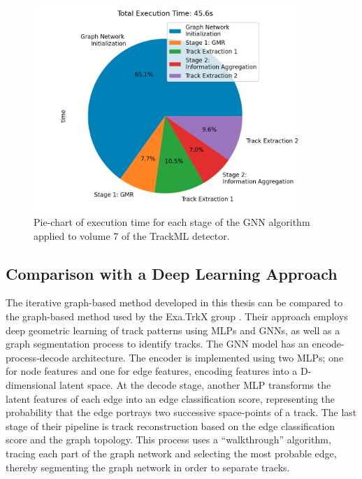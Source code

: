 \begin{figure}[htbp]
    \centering
    \includegraphics[width=0.9\textwidth]{images/7-results/execution-time-endcap-1.png}
    \caption{Pie-chart of execution time for each stage of the GNN algorithm applied to volume 7 of the TrackML detector.}
    \label{fig:execution-time-endcap-1}%
\end{figure}









\subsection{Comparison with a Deep Learning Approach}

The iterative graph-based method developed in this thesis can be compared to the graph-based method used by the Exa.TrkX group \cite{Caillou:28155782}. Their approach employs deep geometric learning of track patterns using MLPs and GNNs, as well as a graph segmentation process to identify tracks. The GNN model has an encode-process-decode architecture. The encoder is implemented using two MLPs; one for node features and one for edge features, encoding features into a D-dimensional latent space. At the decode stage, another MLP transforms the latent features of each edge into an edge classification score, representing the probability that the edge portrays two successive space-points of a track. The last stage of their pipeline is track reconstruction based on the edge classification score and the graph topology. This process uses a “walkthrough” algorithm, tracing each part of the graph network and selecting the most probable edge, thereby segmenting the graph network in order to separate tracks.

